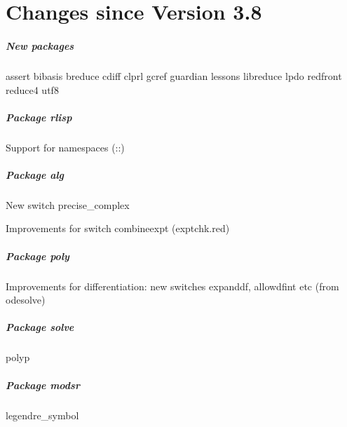 \chapter{Changes since Version 3.8}

\paragraph*{New packages}

assert
bibasis
breduce
cdiff
clprl
gcref
guardian
lessons
libreduce
lpdo
redfront
reduce4
utf8

\paragraph*{Package rlisp}

Support for namespaces (::)

\paragraph*{Package alg}

New switch precise\_complex

Improvements for switch combineexpt (exptchk.red)

\paragraph*{Package poly}

Improvements for differentiation: new switches expanddf, allowdfint etc (from odesolve)

\paragraph*{Package solve}

polyp

\paragraph*{Package modsr}

legendre\_symbol
